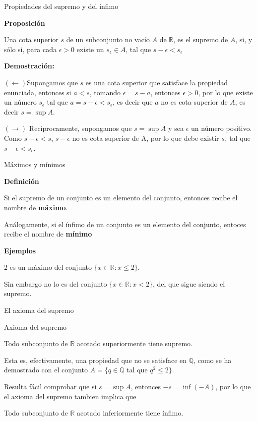 \documentclass[ignorenonframetext,]{beamer}
\begin{document}
\begin{frame}{Propiedades del supremo y del ínfimo}
\protect\hypertarget{propiedades-del-supremo-y-del-uxednfimo-1}{}

\textbf{Proposición}

Una cota superior \(s\) de un subconjunto no vacío \(A\) de
\(\mathbb{R}\), es el supremo de \(A\), si, y sólo si, para cada
\(\epsilon >0\) existe un \(s_{\epsilon} \in A\), tal que
\(s-\epsilon < s_\epsilon\)

\textbf{Demostración:}

\((\leftarrow)\)Supongamos que \(s\) es una cota superior que satisface
la propiedad enunciada, entonces si \(a<s\), tomando \(\epsilon = s-a\),
entonces \(\epsilon >0\), por lo que existe un número \(s_{\epsilon}\)
tal que \(a=s-\epsilon < s_{\epsilon}\), es decir que \(a\) no es cota
superior de \(A\), es decir \(s=\sup A\).

\((\rightarrow)\) Recíprocamente, supongamos que \(s = \sup A\) y sea
\(\epsilon\) un número positivo. Como \(s-\epsilon <s\), \(s-\epsilon\)
no es cota superior de A, por lo que debe existir \(s_{\epsilon}\) tal
que \(s-\epsilon < s_{\epsilon}\).

\end{frame}

\begin{frame}{Máximos y mínimos}
\protect\hypertarget{muxe1ximos-y-muxednimos}{}

\textbf{Definición}

Si el supremo de un conjunto es un elemento del conjunto, entonces
recibe el nombre de \textbf{máximo}.

Análogamente, si el ínfimo de un conjunto es un elemento del conjunto,
entoces recibe el nombre de \textbf{mínimo}

\textbf{Ejemplos}

\(2\) es un máximo del conjunto \(\{x \in \mathbb{R}: x \leq 2 \}\).

Sin embargo no lo es del conjunto \(\{x \in \mathbb{R}: x < 2 \}\), del
que sigue siendo el supremo.

\end{frame}

\begin{frame}{El axioma del supremo}
\protect\hypertarget{el-axioma-del-supremo}{}

Axioma del supremo

Todo subconjunto de \(\mathbb{R}\) acotado superiormente tiene supremo.

Esta es, efectivamente, una propiedad que no se satisface en
\(\mathbb{Q}\), como se ha demostrado con el conjunto
\(A =\{q \in \mathbb{Q}\) tal que \(q^2 \leq 2 \}\).

Resulta fácil comprobar que si \(s= \sup A\), entonces \(-s= \inf(-A)\),
por lo que el axioma del supremo tambien implica que

Todo subconjunto de \(\mathbb{R}\) acotado inferiormente tiene ínfimo.

\end{frame}
\end{document}
